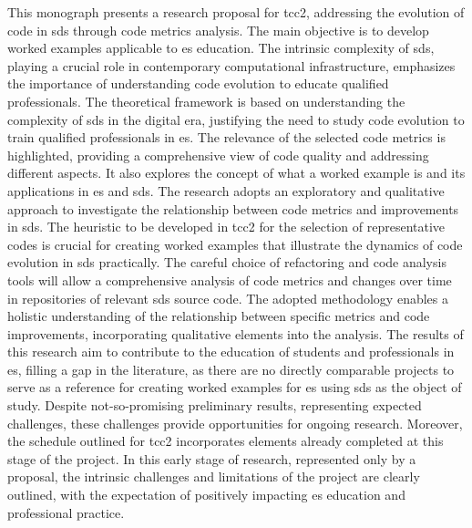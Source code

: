 
\begin{abstractutfpr}%

This monograph presents a research proposal for \gls{tcc2}, addressing the evolution of code in \gls{sds} through code metrics analysis. The main objective is to develop worked examples applicable to \gls{es} education. The intrinsic complexity of \gls{sds}, playing a crucial role in contemporary computational infrastructure, emphasizes the importance of understanding code evolution to educate qualified professionals. The theoretical framework is based on understanding the complexity of \gls{sds} in the digital era, justifying the need to study code evolution to train qualified professionals in \gls{es}. The relevance of the selected code metrics is highlighted, providing a comprehensive view of code quality and addressing different aspects. It also explores the concept of what a worked example is and its applications in \gls{es} and \gls{sds}. The research adopts an exploratory and qualitative approach to investigate the relationship between code metrics and improvements in \gls{sds}. The heuristic to be developed in \gls{tcc2} for the selection of representative codes is crucial for creating worked examples that illustrate the dynamics of code evolution in \gls{sds} practically. The careful choice of refactoring and code analysis tools will allow a comprehensive analysis of code metrics and changes over time in repositories of relevant \gls{sds} source code. The adopted methodology enables a holistic understanding of the relationship between specific metrics and code improvements, incorporating qualitative elements into the analysis. The results of this research aim to contribute to the education of students and professionals in \gls{es}, filling a gap in the literature, as there are no directly comparable projects to serve as a reference for creating worked examples for \gls{es} using \gls{sds} as the object of study. Despite not-so-promising preliminary results, representing expected challenges, these challenges provide opportunities for ongoing research. Moreover, the schedule outlined for \gls{tcc2} incorporates elements already completed at this stage of the project. In this early stage of research, represented only by a proposal, the intrinsic challenges and limitations of the project are clearly outlined, with the expectation of positively impacting \gls{es} education and professional practice.

\end{abstractutfpr}
